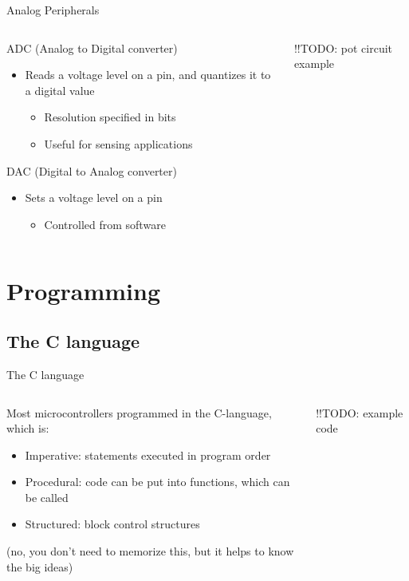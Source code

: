 \documentclass{beamer}
\begin{document}
\begin{frame}{Analog Peripherals}
  \begin{columns}[T]
    \begin{column}{.6\textwidth}
      ADC (Analog to Digital converter)
      \begin{itemize}
        \item Reads a voltage level on a pin, and quantizes it to a digital value
        \begin{itemize}
          \item Resolution specified in bits
          \item Useful for sensing applications
        \end{itemize}
      \end{itemize}
      \phantom{x}
      DAC (Digital to Analog converter)
      \begin{itemize}
        \item Sets a voltage level on a pin
        \begin{itemize}
          \item Controlled from software
        \end{itemize}
      \end{itemize}
    \end{column}

    \begin{column}{0.4\textwidth}
      !!TODO: pot circuit example
    \end{column}
  \end{columns}
\end{frame}

\section{Programming}
\subsection{The C language}
\begin{frame}{The C language}
  \begin{columns}[T]
    \begin{column}{.6\textwidth}
      Most microcontrollers programmed in the C-language, which is:
      \begin{itemize}
        \item Imperative: statements executed in program order
        \item Procedural: code can be put into functions, which can be called
        \item Structured: block control structures
      \end{itemize}
      (no, you don't need to memorize this, but it helps to know the big ideas)
    \end{column}

    \begin{column}{0.4\textwidth}
      !!TODO: example code
    \end{column}
  \end{columns}
\end{frame}
\end{document}
